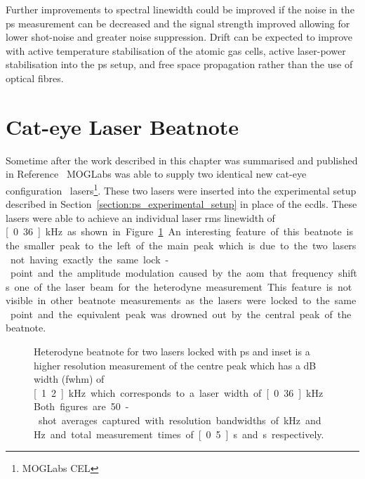 Further improvements to spectral linewidth could be improved if the noise in the \gls{ps} measurement can be decreased and the signal strength improved allowing for lower shot-noise and greater noise suppression.
Drift can be expected to improve with active temperature stabilisation of the atomic gas cells, active laser-power stabilisation into the \gls{ps} setup, and free space propagation rather than the use of optical fibres.

\section{Cat-eye Laser Beatnote}

Sometime after the work described in this chapter was summarised and published in Reference~\cite{torrance_sub-kilohertz_2016} MOGLabs was able to supply two identical new cat-eye configuration~\cite{thompson_narrow_2012} lasers\footnote{MOGLabs CEL}.
These two lasers were inserted into the experimental setup described in Section~\ref{section:ps_experimental_setup} in place of the \glspl{ecdl}.
These lasers were able to achieve an individual laser \gls{rms} linewidth of \unit[0.36]{kHz} as shown in Figure~\ref{figure:cateye_beatnote}.
An interesting feature of this beatnote is the smaller peak to the left of the main peak which is due to the two lasers not having exactly the same lock-point and the amplitude modulation caused by the \gls{aom} that frequency shifts one of the laser beam for the heterodyne measurement.
This feature is not visible in other beatnote measurements as the lasers were locked to the same point and the equivalent peak was drowned out by the central peak of the beatnote.

\begin{figure}
\center

\caption[Heterodyne beatnote for two cat-eye lasers locked with high-bandwidth polarisation spectroscopy.]{Heterodyne beatnote for two lasers locked with \gls{ps} and inset is a higher resolution measurement of the centre peak which has a \unit[-3]{dB} width (\gls{fwhm}) of \unit[1.2]{kHz} which corresponds to a laser width of \unit[0.36]{kHz}.
Both figures are 50-shot averages captured with resolution bandwidths of \unit[30]{kHz} and \unit[100]{Hz} and total measurement times of \unit[0.5]{s} and \unit[2]{s} respectively.}
\label{figure:cateye_beatnote}
\end{figure}